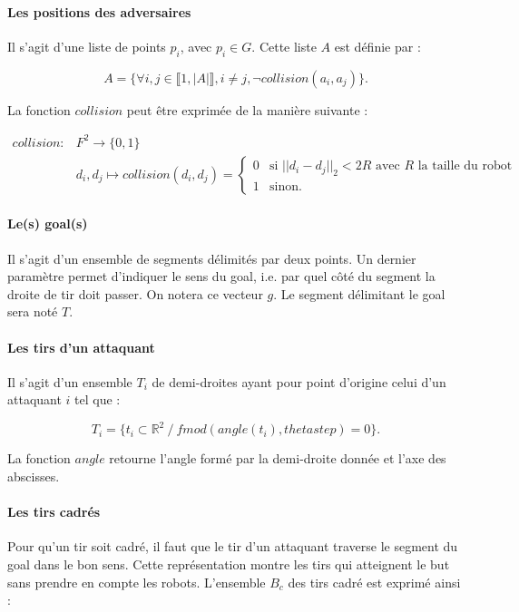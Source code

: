 \documentclass{article}
\begin{document}
\paragraph{Les positions des adversaires} Il s'agit d'une liste de points $p_i$, avec $p_i \in G$. Cette liste $A$ est définie par :

\begin{equation*}
    A = \{ \forall i, j \in \llbracket 1, |A| \rrbracket, i \ne j, \neg collision(a_i, a_j) \}.
\end{equation*}

La fonction $collision$ peut être exprimée de la manière suivante :

\begin{align*}
  collision \colon &F^2 \to \{0, 1 \}\\
  &d_i, d_j \mapsto collision(d_i, d_j) = \begin{cases}
                                   0 & \text{si $|| d_i - d_j ||_2 < 2R$ avec $R$ la taille du robot} \\
                                   1 & \text{sinon.}
  \end{cases}
\end{align*}

\paragraph{Le(s) goal(s)} Il s'agit d'un ensemble de segments délimités par deux points. Un dernier paramètre permet d'indiquer le sens du goal, i.e. par quel \og côté \fg{} du segment la droite de tir doit passer. On notera ce vecteur $g$. Le segment délimitant le goal sera noté $T$.

\paragraph{Les tirs d'un attaquant} Il s'agit d'un ensemble $T_i$ de demi-droites ayant pour point d'origine celui d'un attaquant $i$ tel que :

\begin{equation*}
    T_i = \{ t_i \subset \mathbb{R}^2 \ / \ fmod(angle(t_i), thetastep) = 0 \}.
\end{equation*}

La fonction $angle$ retourne l'angle formé par la demi-droite donnée et l'axe des abscisses.

\paragraph{Les tirs cadrés}
Pour qu'un tir soit cadré, il faut que le tir d'un attaquant traverse le segment du goal dans le bon sens. Cette représentation montre les tirs qui atteignent le but sans prendre en compte les robots. L'ensemble $B_c$ des tirs cadré est exprimé ainsi :
\end{document}
